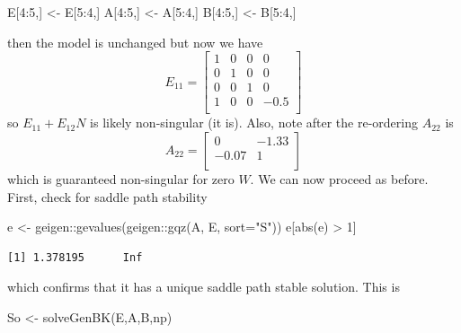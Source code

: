 \documentclass[
  letterpaper,
]{book}
\newenvironment{Shaded}{\begin{snugshade}}{\end{snugshade}}
\newcommand{\AttributeTok}[1]{\textcolor[rgb]{0.40,0.45,0.13}{#1}}
\newcommand{\DecValTok}[1]{\textcolor[rgb]{0.68,0.00,0.00}{#1}}
\newcommand{\FunctionTok}[1]{\textcolor[rgb]{0.28,0.35,0.67}{#1}}
\newcommand{\NormalTok}[1]{\textcolor[rgb]{0.00,0.23,0.31}{#1}}
\newcommand{\OtherTok}[1]{\textcolor[rgb]{0.00,0.23,0.31}{#1}}
\newcommand{\SpecialCharTok}[1]{\textcolor[rgb]{0.37,0.37,0.37}{#1}}
\newcommand{\StringTok}[1]{\textcolor[rgb]{0.13,0.47,0.30}{#1}}
\begin{document}
\begin{Shaded}
\begin{Highlighting}[]
\NormalTok{E[}\DecValTok{4}\SpecialCharTok{:}\DecValTok{5}\NormalTok{,] }\OtherTok{\textless{}{-}}\NormalTok{ E[}\DecValTok{5}\SpecialCharTok{:}\DecValTok{4}\NormalTok{,]}
\NormalTok{A[}\DecValTok{4}\SpecialCharTok{:}\DecValTok{5}\NormalTok{,] }\OtherTok{\textless{}{-}}\NormalTok{ A[}\DecValTok{5}\SpecialCharTok{:}\DecValTok{4}\NormalTok{,]}
\NormalTok{B[}\DecValTok{4}\SpecialCharTok{:}\DecValTok{5}\NormalTok{,] }\OtherTok{\textless{}{-}}\NormalTok{ B[}\DecValTok{5}\SpecialCharTok{:}\DecValTok{4}\NormalTok{,]}
\end{Highlighting}
\end{Shaded}

then the model is unchanged but now we have \[  
E_{11} = \left[\begin{matrix}1 &0 &0 &0 \\0 &1 &0 &0 \\0 &0 &1 &0 \\1 &0 &0 &-0.5 \\\end{matrix}\right] 
\] so \(E_{11} + E_{12}N\) is likely non-singular (it is). Also, note
after the re-ordering \(A_{22}\) is \[  
A_{22} = \left[\begin{matrix}0 &-1.33 \\-0.07 &1 \\\end{matrix}\right] 
\] which is guaranteed non-singular for zero \(W\). We can now proceed
as before. First, check for saddle path stability

\begin{Shaded}
\begin{Highlighting}[]
\NormalTok{e }\OtherTok{\textless{}{-}}\NormalTok{ geigen}\SpecialCharTok{::}\FunctionTok{gevalues}\NormalTok{(geigen}\SpecialCharTok{::}\FunctionTok{gqz}\NormalTok{(A, E, }\AttributeTok{sort=}\StringTok{"S"}\NormalTok{))}
\NormalTok{e[}\FunctionTok{abs}\NormalTok{(e) }\SpecialCharTok{\textgreater{}} \DecValTok{1}\NormalTok{]}
\end{Highlighting}
\end{Shaded}

\begin{verbatim}
[1] 1.378195      Inf
\end{verbatim}

which confirms that it has a unique saddle path stable solution. This is

\begin{Shaded}
\begin{Highlighting}[]
\NormalTok{So }\OtherTok{\textless{}{-}} \FunctionTok{solveGenBK}\NormalTok{(E,A,B,np)}
\end{Highlighting}
\end{Shaded}
\end{document}
